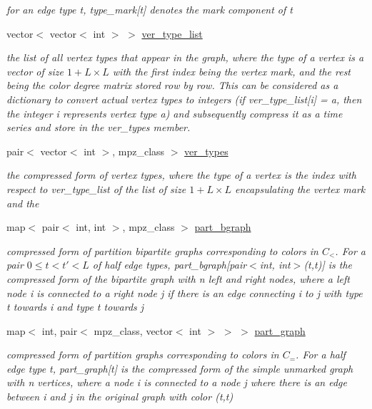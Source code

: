 \begin{DoxyCompactItemize}
\begin{DoxyCompactList}\small\item\em for an edge type t, type\+\_\+mark\mbox{[}t\mbox{]} denotes the mark component of t \end{DoxyCompactList}\item 
vector$<$ vector$<$ int $>$ $>$ \hyperlink{classmarked__graph__compressed_af2e3e55223d436628a02758dfae88493}{ver\+\_\+type\+\_\+list}
\begin{DoxyCompactList}\small\item\em the list of all vertex types that appear in the graph, where the type of a vertex is a vector of size $1+L \times L$ with the first index being the vertex mark, and the rest being the color degree matrix stored row by row. This can be considered as a dictionary to convert actual vertex types to integers (if ver\+\_\+type\+\_\+list\mbox{[}i\mbox{]} = a, then the integer i represents vertex type a) and subsequently compress it as a time series and store in the ver\+\_\+types member. \end{DoxyCompactList}\item 
pair$<$ vector$<$ int $>$, mpz\+\_\+class $>$ \hyperlink{classmarked__graph__compressed_af446cc5e23c241a92b76642fd5ebc403}{ver\+\_\+types}
\begin{DoxyCompactList}\small\item\em the compressed form of vertex types, where the type of a vertex is the index with respect to ver\+\_\+type\+\_\+list of the list of size $1 + L \times L$ encapsulating the vertex mark and the \end{DoxyCompactList}\item 
map$<$ pair$<$ int, int $>$, mpz\+\_\+class $>$ \hyperlink{classmarked__graph__compressed_a7b3267063fba30b45eb21b3ba4e07536}{part\+\_\+bgraph}
\begin{DoxyCompactList}\small\item\em compressed form of partition bipartite graphs corresponding to colors in $C_<$. For a pair $0 \leq t < t' < L$ of half edge types, part\+\_\+bgraph\mbox{[}pair$<$int, int$>$(t,t\textquotesingle{})\mbox{]} is the compressed form of the bipartite graph with n left and right nodes, where a left node i is connected to a right node j if there is an edge connecting i to j with type t towards i and type t\textquotesingle{} towards j \end{DoxyCompactList}\item 
map$<$ int, pair$<$ mpz\+\_\+class, vector$<$ int $>$ $>$ $>$ \hyperlink{classmarked__graph__compressed_ae179a4737e6eab905c18a94d44ef64b7}{part\+\_\+graph}
\begin{DoxyCompactList}\small\item\em compressed form of partition graphs corresponding to colors in $C_=$. For a half edge type t, part\+\_\+graph\mbox{[}t\mbox{]} is the compressed form of the simple unmarked graph with n vertices, where a node i is connected to a node j where there is an edge between i and j in the original graph with color (t,t) \end{DoxyCompactList}\end{DoxyCompactItemize}


